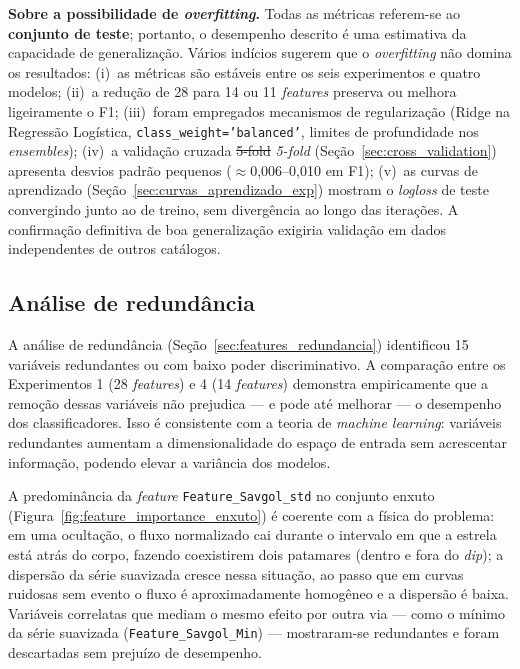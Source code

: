 \documentclass[msc]{on} %
\makeatletter
\providecommand{\DIFaddtex}[1]{{\protect\color{red}#1}} %
\providecommand{\DIFdeltex}[1]{{\protect\color{red}\sout{#1}}} %
\providecommand{\DIFaddbegin}{} %
\providecommand{\DIFaddend}{} %
\providecommand{\DIFdelbegin}{} %
\providecommand{\DIFdelend}{} %
\providecommand{\DIFadd}[1]{\texorpdfstring{\DIFaddtex{#1}}{#1}} %
\providecommand{\DIFdel}[1]{\texorpdfstring{\DIFdeltex{#1}}{}} %
\let\sout@orig\sout %
\renewcommand{\sout}[1]{\ifmmode\text{\sout@orig{\ensuremath{#1}}}\else\sout@orig{#1}\fi} %
\makeatother
\begin{document}
\textbf{Sobre a possibilidade de \textit{overfitting}.} Todas as métricas referem-se ao \textbf{conjunto de teste}; portanto, o desempenho descrito é uma estimativa da capacidade de generalização. Vários indícios sugerem que o \textit{overfitting} não domina os resultados: (i)~as métricas são estáveis entre os seis experimentos e quatro modelos; (ii)~a redução de 28 para 14 ou 11 \textit{features} preserva ou melhora ligeiramente o F1; (iii)~foram empregados mecanismos de regularização (Ridge na Regressão Logística, \texttt{class\_weight='balanced'}, limites de profundidade nos \textit{ensembles}); (iv)~a validação cruzada \DIFdelbegin \DIFdel{5-fold }\DIFdelend \DIFaddbegin \textit{\DIFadd{5-fold}} \DIFaddend (Seção~\ref{sec:cross_validation}) apresenta desvios padrão pequenos ($\approx$0,006--0,010 em F1); (v)~as curvas de aprendizado (Seção~\ref{sec:curvas_aprendizado_exp}) mostram o \textit{logloss} de teste convergindo junto ao de treino, sem divergência ao longo das iterações. A confirmação definitiva de boa generalização exigiria validação em dados independentes de outros catálogos.

\subsection{Análise de redundância}

A análise de redundância (Seção~\ref{sec:features_redundancia}) identificou 15 variáveis redundantes ou com baixo poder discriminativo. A comparação entre os Experimentos 1 (28 \textit{features}) e 4 (14 \textit{features}) demonstra empiricamente que a remoção dessas variáveis não prejudica --- e pode até melhorar --- o desempenho dos classificadores. Isso é consistente com a teoria de \textit{machine learning}: variáveis redundantes aumentam a dimensionalidade do espaço de entrada sem acrescentar informação, podendo elevar a variância dos modelos.

A predominância da \textit{feature} \texttt{Feature\_Savgol\_std} no conjunto enxuto (Figura~\ref{fig:feature_importance_enxuto}) é coerente com a física do problema: em uma ocultação, o fluxo normalizado cai durante o intervalo em que a estrela está atrás do corpo, fazendo coexistirem dois patamares (dentro e fora do \textit{dip}); a dispersão da série suavizada cresce nessa situação, ao passo que em curvas ruidosas sem evento o fluxo é aproximadamente homogêneo e a dispersão é baixa. Variáveis correlatas que mediam o mesmo efeito por outra via --- como o mínimo da série suavizada (\texttt{Feature\_Savgol\_Min}) --- mostraram-se redundantes e foram descartadas sem prejuízo de desempenho.
\end{document}
